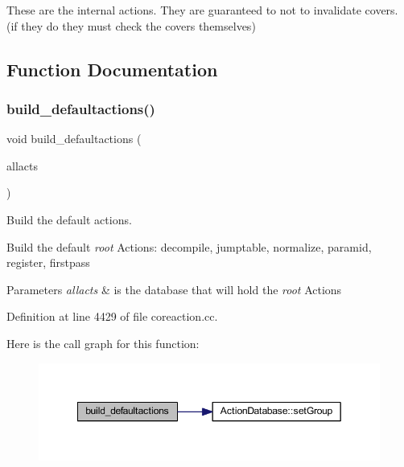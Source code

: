 These are the internal actions. They are guaranteed to not to invalidate covers. (if they do they must check the covers themselves) 

\subsection{Function Documentation}
\mbox{\label{coreaction_8hh_a5e88524a287b92d8946d5906103df514}} 
\subsubsection{\texorpdfstring{build\_defaultactions()}{build\_defaultactions()}}
{\footnotesize\ttfamily void build\+\_\+defaultactions (\begin{DoxyParamCaption}\item[{\mbox{\hyperlink{class_action_database}{Action\+Database}} \&}]{allacts }\end{DoxyParamCaption})}



Build the default actions. 

Build the default {\itshape root} Actions\+: decompile, jumptable, normalize, paramid, register, firstpass 
\begin{DoxyParams}{Parameters}
{\em allacts} & is the database that will hold the {\itshape root} Actions \\
\hline
\end{DoxyParams}


Definition at line 4429 of file coreaction.\+cc.

Here is the call graph for this function\+:
\nopagebreak
\begin{figure}[H]
\begin{center}
\leavevmode
\includegraphics[width=349pt]{coreaction_8hh_a5e88524a287b92d8946d5906103df514_cgraph}
\end{center}
\end{figure}
\mbox{\label{coreaction_8hh_a122798abac4d42f44020ef5d71d689e3}} 
